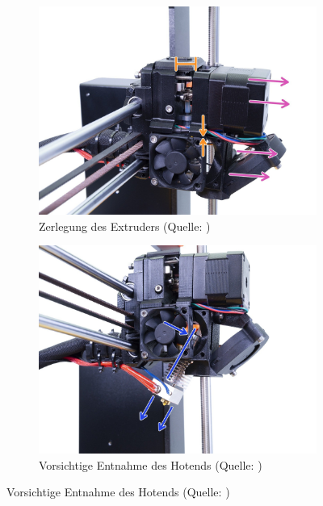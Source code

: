 \begin{itemize}
\begin{figure}[h]
      \end{figure}
      \begin{figure}[h]
        \centering
        \begin{subfigure}[b]{0.45\textwidth}
          \includegraphics[width=0.5\linewidth]{bilder/Anleitung - Zerlegen1.jpg}
          \caption[Anleitung: Zerlegung des Extruders] {Zerlegung des Extruders (Quelle: \autocite{Prusa})}
        \label{Zerlegen1}
        \end{subfigure}
        \hfill
        \begin{subfigure}[b]{0.45\textwidth}
          \includegraphics[width=\textwidth]{bilder/Anleitung - Zerlegen2.jpg}
          \caption[Anleitung: Vorsichtige Entnahme des Hotends] {Vorsichtige Entnahme des Hotends (Quelle: \autocite{Prusa})}
          \label{Zerlegen2}
        \end{subfigure}
      \end{figure}
      \FloatBarrier


\end{itemize}

